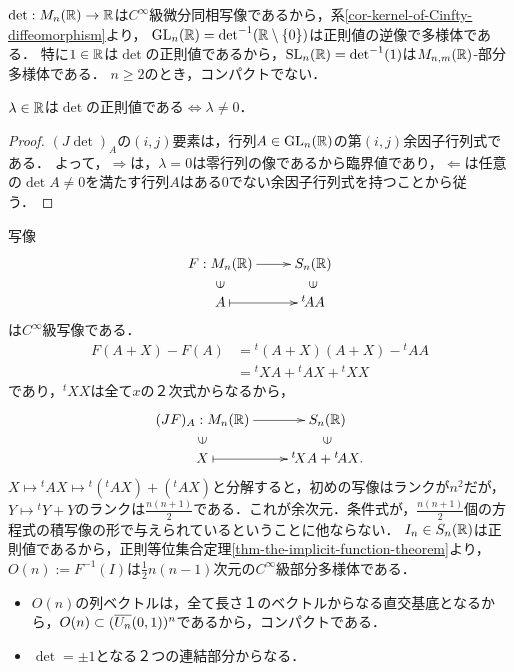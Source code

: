 \documentclass[uplatex,dvipdfmx]{jsreport}
\begin{document}
\begin{example}\label{example-GL-as-submanifold-of-Euclidean-space}
    $\det:M_n(\mathbb{R})\to\mathbb{R}$は$C^\infty$級微分同相写像であるから，系\ref{cor-kernel-of-Cinfty-diffeomorphism}より，
    $\mathrm{GL}_n(\mathbb{R})=\mathrm{det}^{-1}(\mathbb{R}\setminus\{0\})$は正則値の逆像で多様体である．
    特に$1\in\mathbb{R}$は$\det$の正則値であるから，$\mathrm{SL}_n(\mathbb{R})=\det^{-1}(1)$は$M_{n,m}(\mathbb{R})$-部分多様体である．
    $n\ge 2$のとき，コンパクトでない．
    \begin{lemma}
        $\lambda\in\mathbb{R}$は$\det$の正則値である$\Leftrightarrow\lambda\ne 0$．
    \end{lemma}
    \begin{proof}
        $(J\det)_A$の$(i,j)$要素は，行列$A\in\mathrm{GL}_n(\mathbb{R})$の第$(i,j)$余因子行列式である．
        よって，$\Rightarrow$は，$\lambda=0$は零行列の像であるから臨界値であり，$\Leftarrow$は任意の$\det A\ne 0$を満たす行列$A$はある$0$でない余因子行列式を持つことから従う．
    \end{proof}
\end{example}

\begin{example}
    写像
    \[\xymatrix@R-2pc{
        F:M_n(\R)\ar[r]&S_n(\R)\\
        \rotatebox[origin=c]{90}{$\in$}&\rotatebox[origin=c]{90}{$\in$}\\
        A\ar@{|->}[r]&{}^t\!AA
    }\]
    は$C^\infty$級写像である．
    \begin{align*}
        F(A+X)-F(A)&={}^t\!(A+X)(A+X)-{}^t\!AA\\
        &={}^t\!XA+{}^t\!AX+{}^t\!XX
    \end{align*}
    であり，${}^t\!XX$は全て$x$の２次式からなるから，
    \[\xymatrix@R-2pc{
        (JF)_A:M_n(\R)\ar[r]&S_n(\R)\\
        \rotatebox[origin=c]{90}{$\in$}&\rotatebox[origin=c]{90}{$\in$}\\
        X\ar@{|->}[r]&{}^t\!XA+{}^t\!AX.
    }\]
    $X\mapsto{}^t\!AX\mapsto{}^t\!({}^t\!AX)+({}^t\!AX)$と分解すると，初めの写像はランクが$n^2$だが，$Y\mapsto{}^t\!Y+Y$のランクは$\frac{n(n+1)}{2}$である．これが余次元．条件式が，$\frac{n(n+1)}{2}$個の方程式の積写像の形で与えられているということに他ならない．
    $I_n\in S_n(\mathbb{R})$は正則値であるから，正則等位集合定理\ref{thm-the-implicit-function-theorem}より，$O(n):=F^{-1}(I)$は$\frac{1}{2}n(n-1)$次元の$C^\infty$級部分多様体である．
    \begin{itemize}
        \item $O(n)$の列ベクトルは，全て長さ１のベクトルからなる直交基底となるから，$O(n)\subset(\overline{U_n}(0,1))^n$であるから，コンパクトである．
        \item $\det=\pm 1$となる２つの連結部分からなる．
    \end{itemize}
\end{example}
\end{document}
